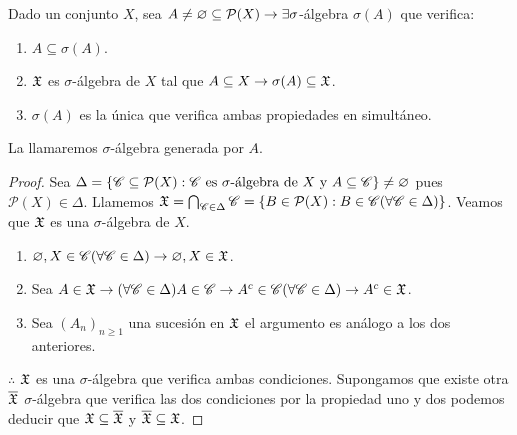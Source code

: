\begin{prop}
    Dado un conjunto $X$, sea $A \neq \varnothing \subseteq \mathcal{P}(X) \to \exists \sigma$-álgebra $\sigma(A)$ que verifica: \begin{enumerate}
        \item $A \subseteq \sigma(A)$.
        \item $\mathfrak{X}$ es $\sigma$-álgebra de $X$ tal que $A \subseteq X \to \sigma(A) \subseteq \mathfrak{X}$.
        \item $\sigma(A)$ es la única que verifica ambas propiedades en simultáneo.
    \end{enumerate}
    La llamaremos $\sigma$-álgebra generada por $A$.

    \begin{proof}
        Sea $\Delta = \{ \mathscr{C} \subseteq \mathcal{P}(X) : \mathscr{C} \text{ es } \sigma \text{-álgebra de } X \text{ y } A \subseteq \mathscr{C} \} \neq \varnothing$ pues $\mathcal{P}(X) \in \Delta$.
        Llamemos $\mathfrak{X} = \bigcap_{\mathscr{C} \in \Delta} \mathscr{C} = \{ B \in \mathcal{P}(X) : B \in \mathscr{C} (\forall \mathscr{C} \in \Delta) \}$.
        Veamos que $\mathfrak{X}$ es una $\sigma$-álgebra de $X$.
        \begin{enumerate}
            \item $\varnothing, X \in \mathscr{C} (\forall \mathscr{C} \in \Delta) \to \varnothing, X \in \mathfrak{X}$.
            \item Sea $A \in \mathfrak{X} \to (\forall \mathscr{C} \in \Delta) A \in \mathscr{C} \to A^c \in \mathscr{C} (\forall \mathscr{C} \in \Delta) \to A^c \in \mathfrak{X}$.
            \item Sea $(A_n)_{n \geq 1}$ una sucesión en $\mathfrak{X}$ el argumento es análogo a los dos anteriores.
        \end{enumerate}
        $\therefore$ $\mathfrak{X}$ es una $\sigma$-álgebra que verifica ambas condiciones.
        Supongamos que existe otra $\overline{\mathfrak{X}}$ $\sigma$-álgebra que verifica las dos condiciones por la propiedad uno y dos podemos deducir que $\mathfrak{X} \subseteq \overline{\mathfrak{X}}$ y $\overline{\mathfrak{X}} \subseteq \mathfrak{X}$.
    \end{proof}
\end{prop}

